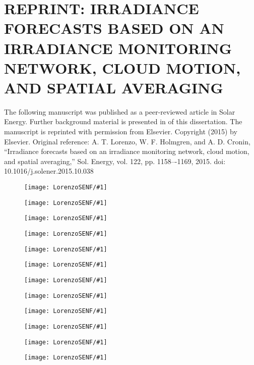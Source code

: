 \chapter{REPRINT: IRRADIANCE FORECASTS BASED ON AN IRRADIANCE MONITORING NETWORK, CLOUD MOTION, AND SPATIAL AVERAGING}
\label{app:network}
The following manuscript was published as a peer-reviewed article in
Solar Energy.
Further background material is presented in  of
this dissertation.
The manuscript is reprinted with permission from Elsevier.
Copyright (2015) by Elsevier.
Original reference: A. T. Lorenzo, W. F. Holmgren, and A. D. Cronin,
``Irradiance forecasts based on an irradiance monitoring network,
cloud motion, and spatial averaging,'' Sol. Energy, vol. 122,
pp. 1158–-1169, 2015. doi: 10.1016/j.solener.2015.10.038

\newcommand{\figNF}[1]{
\begin{figure}
\texttt{[image: LorenzoSENF/\#1]}
\end{figure}
}


\figNF{pg1}
\figNF{pg2}
\figNF{pg3}
\figNF{pg4}
\figNF{pg5}
\figNF{pg6}
\figNF{pg7}
\figNF{pg8}
\figNF{pg9}
\figNF{pg10}
\figNF{pg11}
\figNF{pg12}

